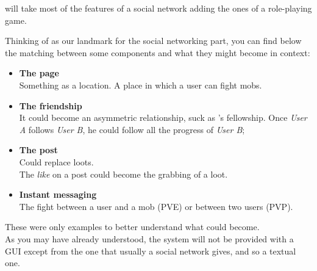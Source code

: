 		\SocialBattle will take most of the features of a social network adding the 
		ones of a role-playing game.

		Thinking of \Facebook as our landmark for the social networking part, 
		you can find below the matching between some \Facebook components and what 
		they might become in \SocialBattle context:
		\begin{itemize}
			\item \textbf{The page}\\
			Something as a location. A place in which a user can fight mobs.

			\item \textbf{The friendship}\\
			It could become an asymmetric relationship, suck as \Twitter's fellowship.
			Once \textit{User A} follows \textit{User B}, he could follow all the progress
			of \textit{User B};

			\item \textbf{The post}\\
			Could replace loots.\\
			The \textit{like} on a post could become the grabbing of a loot.

			\item \textbf{Instant messaging}\\
			The fight between a user and a mob (PVE) or between two users (PVP).
		\end{itemize}

		These were only examples to better understand what \SocialBattle could become.\\
		As you may have already understood, the system will not be provided with a GUI except from the one 
		that usually a social network gives, and so a textual one.

